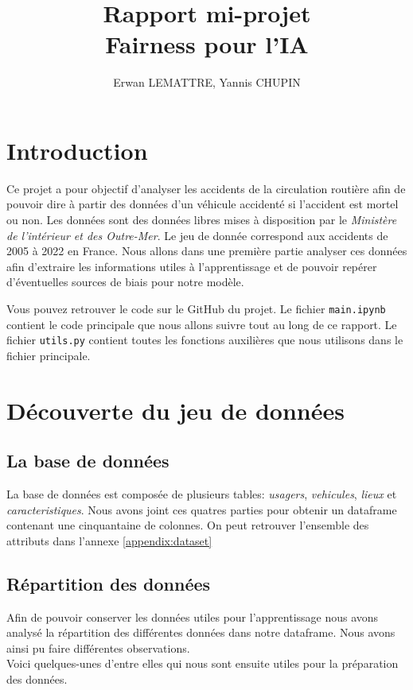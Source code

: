 \documentclass{article}
\author{Erwan LEMATTRE, Yannis CHUPIN}
\title{Rapport mi-projet\\Fairness pour l'IA}
\begin{document}
    \maketitle
    \newpage
    \tableofcontents
    \newpage

    \section{Introduction}
    Ce projet a pour objectif d'analyser les accidents de la circulation routière afin de pouvoir dire 
    à partir des données d'un véhicule accidenté si l'accident est mortel ou non.
    Les données sont des données libres mises à disposition par le \textit{Ministère de l'intérieur et des 
    Outre-Mer}. Le jeu de donnée correspond aux accidents de 2005 à 2022 en France. Nous allons dans une première 
    partie analyser ces données afin d'extraire les informations utiles à l'apprentissage et de pouvoir repérer 
    d'éventuelles sources de biais pour notre modèle.
    
    Vous pouvez retrouver le code sur le GitHub du projet. Le fichier \texttt{main.ipynb} contient 
    le code principale que nous allons suivre tout au long de ce rapport. Le fichier \texttt{utils.py} 
    contient toutes les fonctions auxilières que nous utilisons dans le fichier principale.

    \section{Découverte du jeu de données}
    \subsection{La base de données}
    La base de données est composée de plusieurs tables: \textit{usagers}, \textit{vehicules}, \textit{lieux} et 
    \textit{caracteristiques}. Nous avons joint ces quatres parties pour obtenir un dataframe contenant une 
    cinquantaine de colonnes. 
    On peut retrouver l'ensemble des attributs dans l'annexe \ref{appendix:dataset}


    \subsection{Répartition des données}
    Afin de pouvoir conserver les données utiles pour l'apprentissage nous avons analysé la répartition des 
    différentes données dans notre dataframe.
    Nous avons ainsi pu faire différentes observations. 
    \\
    Voici quelques-unes d'entre elles qui nous sont ensuite
    utiles pour la préparation des données.
\end{document}
